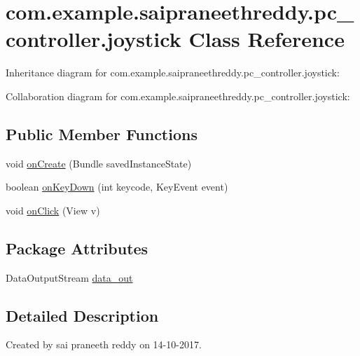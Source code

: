\hypertarget{classcom_1_1example_1_1saipraneethreddy_1_1pc__controller_1_1joystick}{}\section{com.\+example.\+saipraneethreddy.\+pc\+\_\+controller.\+joystick Class Reference}
\label{classcom_1_1example_1_1saipraneethreddy_1_1pc__controller_1_1joystick}


Inheritance diagram for com.\+example.\+saipraneethreddy.\+pc\+\_\+controller.\+joystick\+:


Collaboration diagram for com.\+example.\+saipraneethreddy.\+pc\+\_\+controller.\+joystick\+:
\subsection*{Public Member Functions}
\begin{DoxyCompactItemize}
\item 
void \hyperlink{classcom_1_1example_1_1saipraneethreddy_1_1pc__controller_1_1joystick_a583e9f95403ae1e90c929595dd98de66}{on\+Create} (Bundle saved\+Instance\+State)
\item 
boolean \hyperlink{classcom_1_1example_1_1saipraneethreddy_1_1pc__controller_1_1joystick_a570f03acd282e5bafbddbf2d9a111310}{on\+Key\+Down} (int keycode, Key\+Event event)
\item 
void \hyperlink{classcom_1_1example_1_1saipraneethreddy_1_1pc__controller_1_1joystick_a1b9ada1ffad695b5c18e05cc6a3ad219}{on\+Click} (View v)
\end{DoxyCompactItemize}
\subsection*{Package Attributes}
\begin{DoxyCompactItemize}
\item 
Data\+Output\+Stream \hyperlink{classcom_1_1example_1_1saipraneethreddy_1_1pc__controller_1_1joystick_aa30b405a764037cea18b34f367b1d13e}{data\+\_\+out}
\end{DoxyCompactItemize}


\subsection{Detailed Description}
Created by sai praneeth reddy on 14-\/10-\/2017. 

